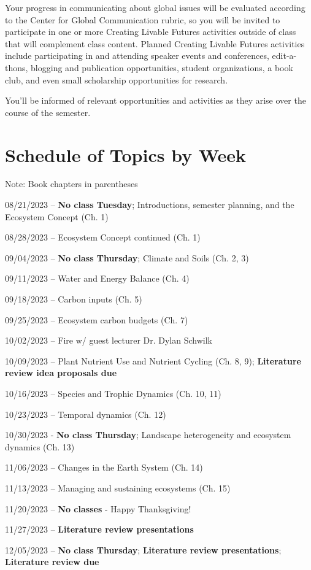 \documentclass[12pt, notitlepage]{article}   	%
\begin{document}
{Your progress in communicating about global issues will be evaluated according to the 
Center for Global Communication rubric, so you will be invited to participate 
in one or more Creating Livable Futures activities outside of class that will 
complement class content. 
Planned Creating Livable Futures activities include participating in and attending 
speaker events and conferences, edit-a-thons, blogging and publication opportunities, 
student organizations, a book club, and even small scholarship opportunities for research. 

You’ll be informed of relevant opportunities and activities as they arise over 
the course of the semester.

\newpage

\section*{Schedule of Topics by Week}
Note: Book chapters in parentheses \par
08/21/2023 – \textbf{No class Tuesday}; Introductions, semester planning, and the Ecosystem Concept (Ch. 1) \par
08/28/2023 – Ecosystem Concept continued (Ch. 1) \par
09/04/2023 – \textbf{No class Thursday}; Climate and Soils (Ch. 2, 3) \par
09/11/2023 – Water and Energy Balance (Ch. 4) \par
09/18/2023 – Carbon inputs (Ch. 5) \par
09/25/2023 – Ecosystem carbon budgets (Ch. 7) \par
10/02/2023 – Fire w/ guest lecturer Dr. Dylan Schwilk \par
10/09/2023 – Plant Nutrient Use and Nutrient Cycling (Ch. 8, 9); \textbf{Literature review idea proposals due} \par
10/16/2023 – Species and Trophic Dynamics (Ch. 10, 11) \par
10/23/2023 – Temporal dynamics (Ch. 12) \par
10/30/2023 - \textbf{No class Thursday}; Landscape heterogeneity and ecosystem dynamics (Ch. 13) \par
11/06/2023 – Changes in the Earth System (Ch. 14) \par
11/13/2023 – Managing and sustaining ecosystems (Ch. 15) \par
11/20/2023 – \textbf{No classes} - Happy Thanksgiving! \par
11/27/2023 – \textbf{Literature review presentations} \par
12/05/2023 – \textbf{No class Thursday}; \textbf{Literature review presentations}; \textbf{Literature review due} \par

}
\end{document}
